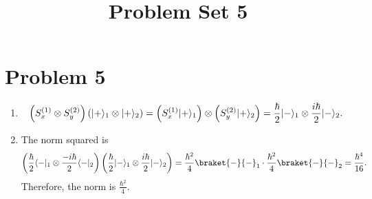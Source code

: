 \documentclass[11pt, letterpaper]{article}
\title{Problem Set 5}
\begin{document}
\makeproblem
\section*{Problem 5}
\begin{enumerate}
	\item 
\[
	\left( S_x^{(1)} \otimes S_y^{(2)}  \right) \left( \lvert+\rangle_1\otimes \lvert+\rangle_2 \right) =\left( S_x^{(1)} \lvert+\rangle_1 \right) \otimes \left(S_y^{(2)} \lvert+\rangle_2\right)=\frac{\hbar}{2} \lvert-\rangle_1 \otimes \frac{i\hbar}{2} \lvert-\rangle_2
.\]
\item The norm squared is
	\[
		\left( \frac{\hbar }{2} \bra{-}_1  \otimes \frac{-i\hbar }{2} \bra{-}_2   \right) \left( \frac{\hbar }{2} \ket{-}_1 \otimes \frac{i\hbar }{2} \ket{-}_2  \right) =\frac{\hbar ^2}{4} \braket{-}{-}_1 \cdot \frac{\hbar ^2}{4} \braket{-}{-}_2 =\frac{\hbar ^4}{16} 
	.\]
	Therefore, the norm is $\frac{\hbar ^2}{4} $.
\end{enumerate}
\end{document}
